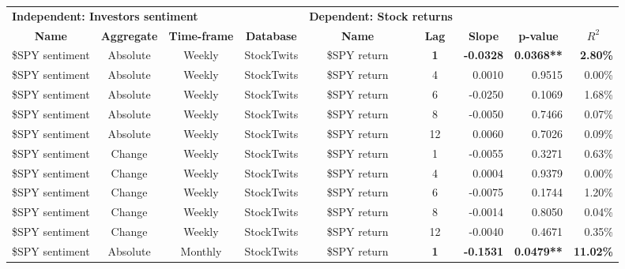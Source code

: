 \begin{longtable}{ccccccrrrrr}
    \multicolumn{4}{l}{\textbf{Independent: Investors sentiment}} & \multicolumn{2}{c}{\textbf{Dependent: Stock returns}} & \multicolumn{2}{c}{} & \multicolumn{2}{c}{} &  \\
    \textbf{Name} & \textbf{Aggregate} & \textbf{Time-frame} & \textbf{Database} & \textbf{Name} & \textbf{Lag} & \multicolumn{1}{c}{\textbf{Slope}} & \multicolumn{2}{c}{\textbf{p-value}} & \multicolumn{2}{c}{\textbf{$R^2$}} \\
    \midrule
    \endhead
    \$SPY sentiment & Absolute & Weekly & StockTwits & \$SPY return & \textbf{1} & \textbf{-0.0328} & \multicolumn{2}{r}{\textbf{0.0368**}} & \multicolumn{2}{r}{\textbf{2.80\%}} \\
    \$SPY sentiment & Absolute & Weekly & StockTwits & \$SPY return & 4     & 0.0010 & \multicolumn{2}{r}{0.9515} & \multicolumn{2}{r}{0.00\%} \\
    \$SPY sentiment & Absolute & Weekly & StockTwits & \$SPY return & 6     & -0.0250 & \multicolumn{2}{r}{0.1069} & \multicolumn{2}{r}{1.68\%} \\
    \$SPY sentiment & Absolute & Weekly & StockTwits & \$SPY return & 8     & -0.0050 & \multicolumn{2}{r}{0.7466} & \multicolumn{2}{r}{0.07\%} \\
    \$SPY sentiment & Absolute & Weekly & StockTwits & \$SPY return & 12    & 0.0060 & \multicolumn{2}{r}{0.7026} & \multicolumn{2}{r}{0.09\%} \\
    \$SPY sentiment & Change & Weekly & StockTwits & \$SPY return & 1     & -0.0055 & \multicolumn{2}{r}{0.3271} & \multicolumn{2}{r}{0.63\%} \\
    \$SPY sentiment & Change & Weekly & StockTwits & \$SPY return & 4     & 0.0004 & \multicolumn{2}{r}{0.9379} & \multicolumn{2}{r}{0.00\%} \\
    \$SPY sentiment & Change & Weekly & StockTwits & \$SPY return & 6     & -0.0075 & \multicolumn{2}{r}{0.1744} & \multicolumn{2}{r}{1.20\%} \\
    \$SPY sentiment & Change & Weekly & StockTwits & \$SPY return & 8     & -0.0014 & \multicolumn{2}{r}{0.8050} & \multicolumn{2}{r}{0.04\%} \\
    \$SPY sentiment & Change & Weekly & StockTwits & \$SPY return & 12    & -0.0040 & \multicolumn{2}{r}{0.4671} & \multicolumn{2}{r}{0.35\%} \\
    \$SPY sentiment & Absolute & Monthly & StockTwits & \$SPY return & \textbf{1} & \textbf{-0.1531} & \multicolumn{2}{r}{\textbf{0.0479**}} & \multicolumn{2}{r}{\textbf{11.02\%}} \\

\end{longtable}

